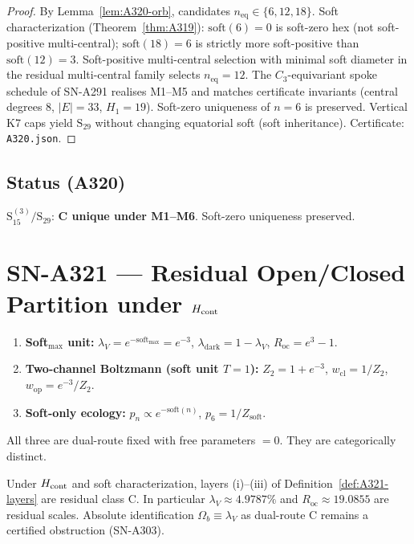 \begin{proof}
By Lemma~\ref{lem:A320-orb}, candidates $n_{\mathrm{eq}}\in\{6,12,18\}$. Soft characterization (Theorem~\ref{thm:A319}): $\mathrm{soft}(6)=0$ is soft-zero hex (not soft-positive multi-central); $\mathrm{soft}(18)=6$ is strictly more soft-positive than $\mathrm{soft}(12)=3$. Soft-positive multi-central selection with minimal soft diameter in the residual multi-central family selects $n_{\mathrm{eq}}=12$. The $C_3$-equivariant spoke schedule of SN-A291 realises M1--M5 and matches certificate invariants (central degrees $8$, $|E|=33$, $H_1=19$). Soft-zero uniqueness of $n=6$ is preserved. Vertical K7 caps yield $\mathrm{S}_{29}$ without changing equatorial soft (soft inheritance). Certificate: \texttt{A320.json}.
\end{proof}

\subsection*{Status (A320)}
$\mathrm{S}_{15}^{(3)}/\mathrm{S}_{29}$: \textbf{C unique under M1--M6}. Soft-zero uniqueness preserved.

\section{SN-A321 --- Residual Open/Closed Partition under $H_{\rm cont}$}
\label{sec:SN-A321}

\begin{definition}
\label{def:A321-layers}
\begin{enumerate}[label=(\roman*)]
\item \textbf{Soft$_{\max}$ unit:} $\lambda_V=e^{-\mathrm{soft}_{\max}}=e^{-3}$, $\lambda_{\mathrm{dark}}=1-\lambda_V$, $R_{\mathrm{oc}}=e^{3}-1$.
\item \textbf{Two-channel Boltzmann (soft unit $T=1$):} $Z_2=1+e^{-3}$, $w_{\mathrm{cl}}=1/Z_2$, $w_{\mathrm{op}}=e^{-3}/Z_2$.
\item \textbf{Soft-only ecology:} $p_n\propto e^{-\mathrm{soft}(n)}$, $p_6=1/Z_{\mathrm{soft}}$.
\end{enumerate}
All three are dual-route fixed with free parameters $=0$. They are categorically distinct.
\end{definition}

\begin{theorem}
\label{thm:A321}
Under $H_{\rm cont}$ and soft characterization, layers (i)--(iii) of Definition~\ref{def:A321-layers} are residual class C. In particular $\lambda_V\approx 4.9787\%$ and $R_{\mathrm{oc}}\approx 19.0855$ are residual scales. Absolute identification $\Omega_b\equiv\lambda_V$ as dual-route C remains a certified obstruction (SN-A303).
\end{theorem}

